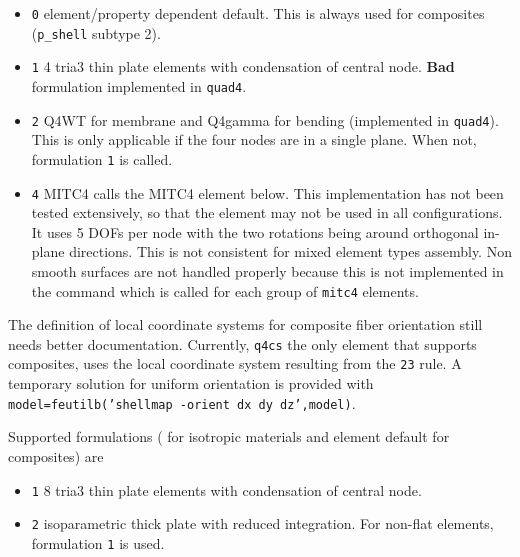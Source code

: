 \begin{itemize}
 \item {\tt 0} element/property dependent default. This is always used for composites ({\tt p\_shell} subtype 2). 
 \item {\tt 1} 4 tria3 thin plate elements with condensation of central node. {\bf Bad} formulation implemented in {\tt quad4}. 
 \item {\tt 2} Q4WT for membrane and Q4gamma for bending (implemented in {\tt quad4}). This is only applicable if the four nodes are in a single plane. When not, formulation {\tt 1} is called.
 \item {\tt 4} MITC4 calls the MITC4 element below. This implementation has not been tested extensively, so that the element may not be used in all configurations.  It uses 5 DOFs per node with the two rotations being around orthogonal in-plane directions. This is not consistent for mixed element types assembly. Non smooth surfaces are not handled properly because this is not implemented in the  command which is called for each group of {\tt mitc4} elements. 
\end{itemize}

\begin{SDT}
The definition of local coordinate systems for composite fiber orientation still needs better documentation. Currently, {\tt q4cs} the only element that supports composites, uses the local coordinate system resulting from the  {\tt 23} rule. A temporary solution for uniform orientation is provided with {\tt model=feutilb('shellmap -orient dx dy dz',model)}. 
\end{SDT}



Supported formulations ( for isotropic materials and element default for composites) are 

\begin{itemize}
 \item {\tt 1} 8 tria3 thin plate elements with condensation of central node.
 \item {\tt 2} isoparametric thick plate with reduced integration. For non-flat elements, formulation {\tt 1} is used.
\end{itemize}


